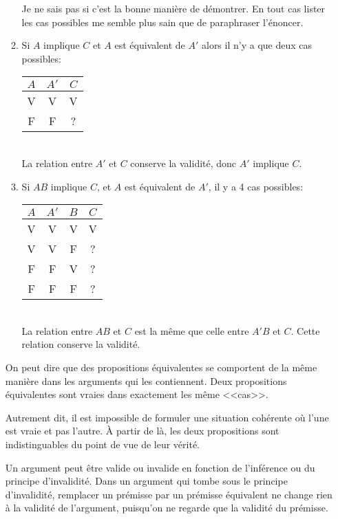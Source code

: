 \documentclass[fleqn,a4paper,nobib]{tufte-handout}
\begin{document}
\begin{enumerate}[label=(\alph*)]
\begin{enumerate}[label=(\arabic*)]
            Je ne sais pas si c'est la bonne manière de démontrer. En tout cas
            lister les cas possibles me semble plus sain que de paraphraser
            l'énoncer.
        \item Si $A$ implique $C$ et $A$ est équivalent de $A'$ alors il n'y a que
        deux cas possibles: \\
        \begin{tabular}{|c|c|c|}
            \hline
            $A$ & $A'$ & $C$ \\
            \hline
            V & V & V \\
            F & F & ? \\
            \hline
        \end{tabular} \\
        La relation entre $A'$ et $C$ conserve la validité, donc $A'$ implique $C$.
        \item Si $A$$B$ implique $C$,
        et $A$ est équivalent de 
        $A'$, il y a 4 cas possibles: \\
        \begin{tabular}{|c|c|c|c|}
            \hline
            $A$ & $A'$ & $B$ & $C$ \\
            \hline
            V & V & V & V \\
            V & V & F & ? \\
            F & F & V & ? \\
            F & F & F & ? \\
            \hline
        \end{tabular} \\
        La relation entre $A$$B$ et $C$ est la même que
        celle entre $A'$$B$ et $C$. Cette relation conserve
        la validité.
    \end{enumerate}

    On peut dire que des propositions équivalentes se comportent
    de la même manière dans les arguments qui les contiennent.
    Deux propositions équivalentes sont vraies dans exactement les
    même <<cas>>.

    Autrement dit, il est impossible de formuler une situation cohérente où l'une
    est vraie et pas l'autre. À partir de là, les deux propositions
    sont indistinguables du point de vue de leur vérité.

    Un argument peut être valide ou invalide en fonction de l'inférence
    ou du principe d'invalidité. Dans un argument qui tombe sous le
    principe d'invalidité, remplacer un prémisse par un prémisse
    équivalent ne change rien à la validité de l'argument, puisqu'on
    ne regarde que la validité du prémisse.
\end{enumerate}
\end{document}
